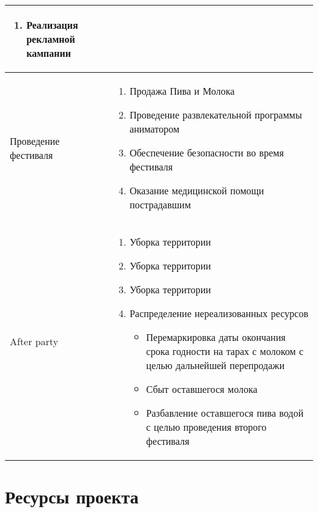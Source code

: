 \documentclass[a4paper,12pt]{article}
\begin{document}
\begin{center}
\begin{longtable}{|p{4cm}|p{11cm}|}
\begin{enumerate}
\begin{enumerate}
      \end{enumerate}
    \item Реализация рекламной кампании
  \end{enumerate} \\
  \hline
  Проведение фестиваля &
  \begin{enumerate}
    \item Продажа Пива и Молока
    \item Проведение развлекательной программы аниматором
    \item Обеспечение безопасности во время фестиваля
    \item Оказание медицинской помощи пострадавшим
  \end{enumerate} \\
  \hline
  After party & 
  \begin{enumerate}
    \item Уборка территории
    \item Уборка территории
    \item Уборка территории
    \item Распределение нереализованных ресурсов
      \begin{itemize}
        \item Перемаркировка даты окончания срока годности на тарах с молоком с целью дальнейшей перепродажи
        \item Сбыт оставшегося молока
        \item Разбавление оставшегося пива водой с целью проведения второго фестиваля
      \end{itemize}
  \end{enumerate}\\
  \hline
\end{longtable}
\end{center}
\section{Ресурсы проекта}
\end{document}
